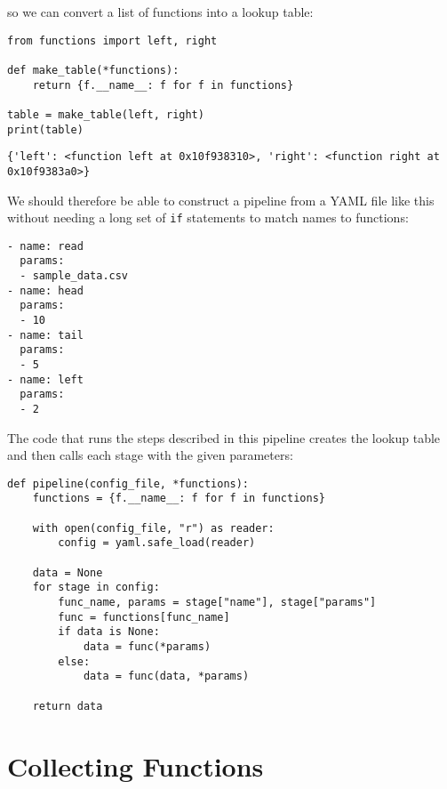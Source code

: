 \documentclass{scrbook}
\begin{document}
\noindent so we can convert a list of functions into a lookup table:


\begin{lstlisting}[frame=single,frameround=tttt]
from functions import left, right

def make_table(*functions):
    return {f.__name__: f for f in functions}

table = make_table(left, right)
print(table)
\end{lstlisting}



\begin{lstlisting}[frame=single,frameround=tttt]
{'left': <function left at 0x10f938310>, 'right': <function right at 0x10f9383a0>}
\end{lstlisting}



We should therefore be able to construct a pipeline
from a YAML file like this
without needing a long set of \texttt{if} statements
to match names to functions:


\begin{lstlisting}[frame=single,frameround=tttt]
- name: read
  params:
  - sample_data.csv
- name: head
  params:
  - 10
- name: tail
  params:
  - 5
- name: left
  params:
  - 2
\end{lstlisting}



The code that runs the steps described in this pipeline
creates the lookup table
and then calls each stage with the given parameters:


\begin{lstlisting}[frame=single,frameround=tttt]
def pipeline(config_file, *functions):
    functions = {f.__name__: f for f in functions}

    with open(config_file, "r") as reader:
        config = yaml.safe_load(reader)

    data = None
    for stage in config:
        func_name, params = stage["name"], stage["params"]
        func = functions[func_name]
        if data is None:
            data = func(*params)
        else:
            data = func(data, *params)

    return data
\end{lstlisting}


\section{Collecting Functions}\label{pipeline-collect}
\end{document}
